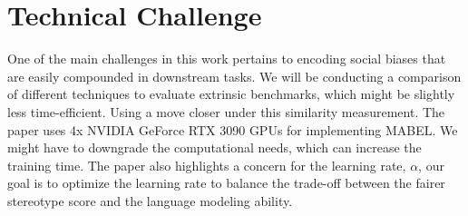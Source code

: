 \documentclass[11pt]{article}
\begin{document}
\section{Technical Challenge}
One of the main challenges in this work pertains to encoding social biases that are easily compounded in downstream tasks. We will be conducting a comparison of different techniques to evaluate extrinsic benchmarks, which might be slightly less time-efficient. Using a move closer under this similarity measurement. The paper uses 4x NVIDIA GeForce RTX 3090 GPUs for implementing MABEL. We might have to downgrade the computational needs, which can increase the training time. The paper also highlights a concern for the learning rate, $\alpha$, our goal is to optimize the learning rate to balance the trade-off between the fairer stereotype score and the language modeling ability. 





\appendix
\end{document}
